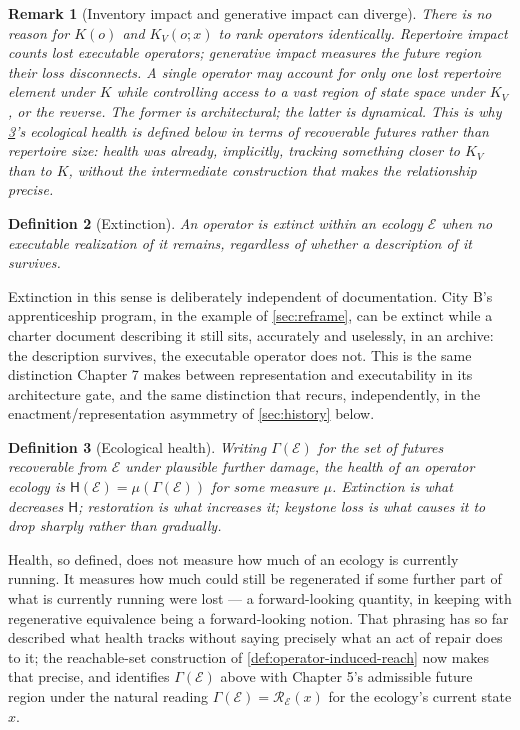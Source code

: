\documentclass[12pt]{report}
\newtheorem{definition}{Definition}[section]
\newtheorem{remark}[definition]{Remark}
\newcommand{\Health}{\ensuremath{\mathsf{H}}}
\begin{document}
\begin{remark}[Inventory impact and generative impact can diverge]
\label{rem:keystone-divergence}
There is no reason for $K(o)$ and $K_V(o;x)$ to rank operators
identically. Repertoire impact counts lost executable operators;
generative impact measures the future region their loss disconnects. A
single operator may account for only one lost repertoire element under
$K$ while controlling access to a vast region of state space under
$K_V$, or the reverse. The former is architectural; the latter is
dynamical. This is why \cref{def:health}'s ecological health is defined
below in terms of recoverable futures rather than repertoire size: health
was already, implicitly, tracking something closer to $K_V$ than to $K$,
without the intermediate construction that makes the relationship
precise.
\end{remark}

\begin{definition}[Extinction]
\label{def:extinction}
An operator is \emph{extinct} within an ecology $\mathcal{E}$ when no
executable realization of it remains, regardless of whether a
description of it survives.
\end{definition}

Extinction in this sense is deliberately independent of documentation.
City B's apprenticeship program, in the example of \cref{sec:reframe},
can be extinct while a charter document describing it still sits,
accurately and uselessly, in an archive: the description survives, the
executable operator does not. This is the same distinction Chapter 7
makes between representation and executability in its architecture gate,
and the same distinction that recurs, independently, in the
enactment/representation asymmetry of \cref{sec:history} below.

\begin{definition}[Ecological health]
\label{def:health}
Writing $\Gamma(\mathcal{E})$ for the set of futures recoverable from
$\mathcal{E}$ under plausible further damage, the \emph{health} of an
operator ecology is $\Health(\mathcal{E}) = \mu(\Gamma(\mathcal{E}))$ for
some measure $\mu$. Extinction is what decreases $\Health$; restoration is
what increases it; keystone loss is what causes it to drop sharply rather
than gradually.
\end{definition}

Health, so defined, does not measure how much of an ecology is currently
running. It measures how much could still be regenerated if some further
part of what is currently running were lost --- a forward-looking
quantity, in keeping with regenerative equivalence being a forward-looking
notion. That phrasing has so far described what health tracks without
saying precisely what an act of repair does to it; the reachable-set
construction of \cref{def:operator-induced-reach} now makes that
precise, and identifies $\Gamma(\mathcal{E})$ above with Chapter 5's
admissible future region under the natural reading $\Gamma(\mathcal{E})
= \mathcal{R}_\mathcal{E}(x)$ for the ecology's current state $x$.
\end{document}

